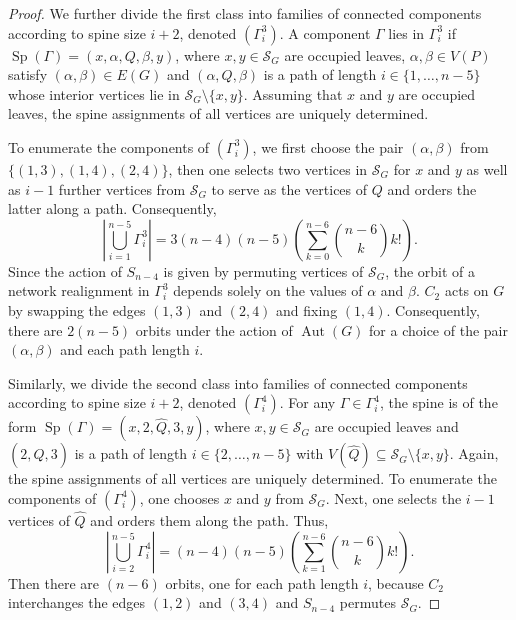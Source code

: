 \documentclass[reqno,dvipsnames]{amsart}
\theoremstyle{plain}
\numberwithin{equation}{section}
\theoremstyle{definition}
\DeclareMathOperator{\Sp}{Sp}
\DeclareMathOperator{\Aut}{Aut}
\begin{document}
\begin{proof}
	We further divide the first class into families of connected components according to spine size $i+2$, denoted $(\Gamma_i^3)$. A component $\Gamma$ lies in $\Gamma^3_i$ if $\Sp(\Gamma)=(x,\alpha,Q,\beta,y)$, where $x,y\in \mathcal{S}_G$ are occupied leaves, $\alpha,\beta\in V(P)$ satisfy $(\alpha,\beta)\in E(G)$ and $(\alpha,Q,\beta)$ is a path of length $i\in\{1,\dots, n-5\}$ whose interior vertices lie in $\mathcal{S}_G \setminus \{x,y\}$. Assuming that $x$ and $y$ are occupied leaves, the spine assignments of all vertices are uniquely determined. 
	
	To enumerate the components of $(\Gamma_i^3)$, we first choose the pair $(\alpha,\beta)$ from $\{(1,3),(1,4),(2,4)\}$, then one selects two vertices in $\mathcal{S}_G$ for $x$ and $y$ as well as $i-1$ further vertices from $\mathcal{S}_G$ to serve as the vertices of $Q$ and orders the latter along a path. Consequently,
	\begin{equation*}
		\left\vert\bigcup\limits_{i=1}^{n-5}\Gamma_i^3\right\vert = 3(n-4)(n-5)\left(\sum\limits_{k=0}^{n-6} \binom{n-6}{k}k! \right).
	\end{equation*}
	Since the action of $S_{n-4}$ is given by permuting vertices of $\mathcal{S}_G$, the orbit of a network realignment in $\Gamma_i^3$ depends solely on the values of $\alpha$ and $\beta$. $C_2$ acts on $G$ by swapping the edges $(1,3)$ and $(2,4)$ and fixing $(1,4)$. Consequently, there are $2(n-5)$ orbits under the action of $\Aut(G)$ for a choice of the pair $(\alpha,\beta)$ and each path length $i$.
	
	Similarly, we divide the second class into families of connected components according to spine size $i+2$, denoted $(\Gamma_i^4)$. For any $\Gamma\in\Gamma^4_i$, the spine is of the form $\Sp(\Gamma)=(x,2,\hat{Q},3,y)$, where $x,y\in \mathcal{S}_G$ are occupied leaves and $(2,\hat{Q},3)$ is a path of length $i\in\{2,\dots,n-5\}$ with $V(\hat{Q})\subseteq \mathcal{S}_G\setminus \{x,y\}$. Again, the spine assignments of all vertices are uniquely determined. To enumerate the components of $(\Gamma^4_i)$, one chooses $x$ and $y$ from $\mathcal{S}_G$. Next, one selects the $i-1$ vertices of $\hat{Q}$ and orders them along the path. Thus,
	\begin{equation*}
		\left\vert\bigcup\limits_{i=2}^{n-5} \Gamma_i^4\right\vert = (n-4)(n-5) \left( \sum\limits_{k=1}^{n-6} \binom{n-6}{k}k! \right).
	\end{equation*}
	Then there are $(n-6)$ orbits, one for each path length $i$, because $C_2$ interchanges the edges $(1,2)$ and $(3,4)$ and $S_{n-4}$ permutes $\mathcal{S}_G$. 
	

\end{proof}
\end{document}
